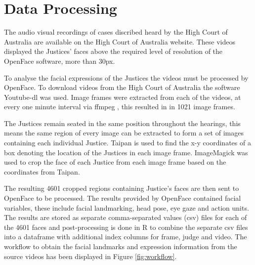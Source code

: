 \documentclass{monashthesis}
\begin{document}
\hypertarget{data-processing}{%
\section{Data Processing}\label{data-processing}}

The audio visual recordings of cases discribed heard by the High Court of Australia \autocite{highcourtau} are available on the High Court of Australia website. These videos displayed the Justices' faces above the required level of resolution of the OpenFace software, more than 30px.

To analyse the facial expressions of the Justices the videos must be processed by OpenFace. To download videos from the High Court of Australia \autocite{highcourtau} the software Youtube-dl \autocite{youtube-dl} was used. Image frames were extracted from each of the videos, at every one minute interval via ffmpeg \autocite{ffmpeg}, this resulted in in 1021 image frames.

The Justices remain seated in the same position throughout the hearings, this means the same region of every image can be extracted to form a set of images containing each individual Justice. Taipan \autocite{Taipan} is used to find the x-y coordinates of a box denoting the location of the Justices in each image frame. ImageMagick \autocite{ImageMagick} was used to crop the face of each Justice from each image frame based on the coordinates from Taipan.

The resulting 4601 cropped regions containing Justice's faces are then sent to OpenFace \autocite{baltrusaitis2018openface} to be processed. The results provided by OpenFace contained facial variables, these include facial landmarking, head pose, eye gaze and action units. The results are stored as separate comma-separated values (csv) files for each of the 4601 faces and post-processing is done in R to combine the separate csv files into a dataframe with additional index columns for frame, judge and video.
The workflow to obtain the facial landmarks and expression information from the source videos has been displayed in Figure \ref{fig:workflow}.
\end{document}
